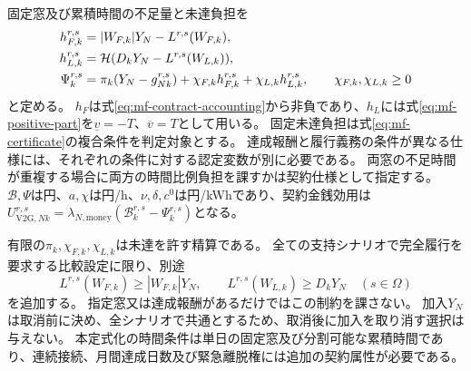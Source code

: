 固定窓及び累積時間の不足量と未達負担を
\begin{align}
 h_{F,k}^{r,s}&=|W_{F,k}|Y_N-L^{r,s}(W_{F,k}),\notag\\
 h_{L,k}^{r,s}&=\mathcal H(D_kY_N-L^{r,s}(W_{L,k})),\notag\\
 \Psi_k^{r,s}&=\pi_k(Y_N-g_{Nk}^{r,s})
   +\chi_{F,k}h_{F,k}^{r,s}+\chi_{L,k}h_{L,k}^{r,s},
 \qquad\chi_{F,k},\chi_{L,k}\ge0
 \label{eq:mf-shortfall-payment}
\end{align}
と定める。
$h_F$は式\eqref{eq:mf-contract-accounting}から非負であり、$h_L$には式\eqref{eq:mf-positive-part}を$\underline v=-T$、$\overline v=T$として用いる。
固定未達負担は式\eqref{eq:mf-certificate}の複合条件を判定対象とする。
達成報酬と履行義務の条件が異なる仕様には、それぞれの条件に対する認定変数が別に必要である。
両窓の不足時間が重複する場合に両方の時間比例負担を課すかは契約仕様として指定する。
$\mathcal B,\Psi$は円、$a,\chi$は円/h、$\nu,\delta,c^0$は円/kWhであり、契約金銭効用は$U_{\mathrm{V2G},Nk}^{r,s}=\lambda_{N,\mathrm{money}}(\mathcal B_k^{r,s}-\Psi_k^{r,s})$となる。

有限の$\pi_k,\chi_{F,k},\chi_{L,k}$は未達を許す精算である。
全ての支持シナリオで完全履行を要求する比較設定に限り、別途
\begin{equation}
 L^{r,s}(W_{F,k})\ge|W_{F,k}|Y_N,\qquad
 L^{r,s}(W_{L,k})\ge D_kY_N
 \quad(s\in\Omega)
 \label{eq:mf-complete-fulfillment}
\end{equation}
を追加する。
指定窓又は達成報酬があるだけではこの制約を課さない。
加入$Y_N$は取消前に決め、全シナリオで共通とするため、取消後に加入を取り消す選択は与えない。
本定式化の時間条件は単日の固定窓及び分割可能な累積時間であり、連続接続、月間達成日数及び緊急離脱権には追加の契約属性が必要である。
